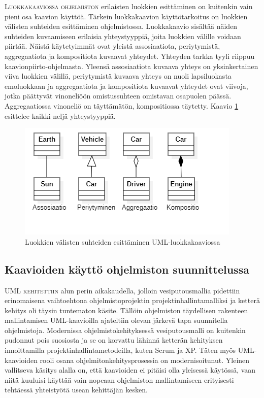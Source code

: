 \documentclass[openany]{book}
\newcommand{\newthought}[1]{\smallskip\textsc{#1}}
\begin{document}
\newthought{Luokkakaaviossa ohjelmiston} erilaisten luokkien esittäminen on kuitenkin vain pieni
osa kaavion käyttöä. Tärkein luokkakaavion käyttötarkoitus on luokkien välisten suhteiden
esittäminen ohjelmistossa. Luokkakaavio sisältää näiden suhteiden kuvaamiseen erilaisia
yhteystyyppiä, joita luokkien välille voidaan piirtää. Näistä käytetyimmät ovat yleistä
assosiaatiota, periytymistä, aggregaatiota ja kompositiota kuvaavat yhteydet. Yhteyden tarkka
tyyli riippuu kaavionpiirto-ohjelmasta. Yleensä assosiaatiota kuvaava yhteys on yksinkertainen
viiva luokkien välillä, periytymistä kuvaava yhteys on nuoli lapsiluokasta emoluokkaan ja
aggregaatiota ja kompositiota kuvaavat yhteydet ovat viivoja, jotka päättyvät vinoneliöön
omistussuhteen omistavan osapuolen päässä. Aggregaatiossa vinoneliö on täyttämätön,
kompositiossa täytetty. Kaavio \ref{luokkakaaviosuhteet} esittelee kaikki neljä yhteystyyppiä.

\begin{figure}
    \includegraphics{ClassDiagramExample2}
    \caption{Luokkien välisten suhteiden esittäminen UML-luokkakaaviossa}
    \label{luokkakaaviosuhteet}
\end{figure}

\subsection{Kaavioiden käyttö ohjelmiston suunnittelussa}
\label{UMLkäyttö}

\newthought{\gls{UML} kehitettiin} alun perin aikakaudella, jolloin vesiputousmallia pidettiin
erinomaisena vaihtoehtona ohjelmistoprojektin projektinhallintamalliksi ja ketterä kehitys oli
täysin tuntematon käsite. Tällöin ohjelmiston täydellisen rakenteen mallintamisen UML-kaavioilla 
ajateltiin olevan järkevä tapa suunnitella ohjelmistoja. Modernissa ohjelmistokehityksessä
vesiputousmalli on kuitenkin pudonnut pois suosiosta ja se on korvattu lähinnä ketterän kehityksen
innoittamilla projektinhallintametodeilla, kuten Scrum ja XP. Täten myös UML-kaavioiden rooli
osana ohjelmitonkehitysprosessia on modernisoitunut. Yleinen vallitseva käsitys alalla on, että
kaavioiden ei pitäisi olla yleisessä käytössä, vaan niitä kuuluisi käyttää vain nopeaan
ohjelmiston mallintamiseen erityisesti tehtäessä yhteistyötä usean kehittäjän kesken.
\end{document}

